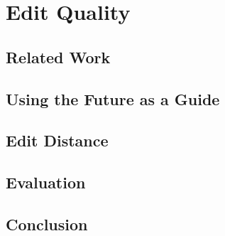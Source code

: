 \chapter{Edit Quality}
\label{ch:editquality}



    \section{Related Work}
    \section{Using the Future as a Guide}
    \section{Edit Distance}
    \section{Evaluation}
    \section{Conclusion}

